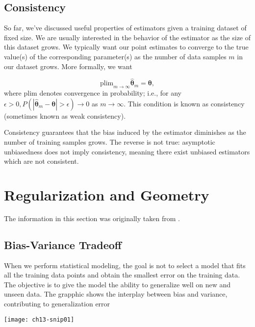 \subsection{Consistency}

So far, we've discussed useful properties of estimators given a training dataset of fixed size. We are usually interested in the behavior of the estimator as the size of this dataset grows. We typically want our point estimates to converge to the true value(s) of the corresponding parameter(s) as the number of data samples $m$ in our dataset grows. More formally, we want

\begin{equation}
\text{plim}_{m \rightarrow \infty} \boldsymbol{\hat\theta}_m = \boldsymbol{\theta},
\end{equation}
where $\text{plim}$ denotes convergence in probability; i.e., for any $\epsilon > 0, P(|\boldsymbol{\hat\theta}_m - \boldsymbol{\theta}| > \epsilon) \rightarrow 0$ as $m \rightarrow \infty$. This condition is known as consistency (sometimes known as weak consistency).

Consistency guarantees that the bias induced by the estimator diminishes as the number of training samples grows. The reverse is not true: asymptotic unbiasedness does not imply consistency, meaning there exist unbiased estimators which are not consistent.


\clearpage
\section{Regularization and Geometry}

The information in this section was originally taken from \cite{MinhPham2019,AnujaNagpal2017}.

\subsection{Bias-Variance Tradeoff}

When we perform statistical modeling, the goal is not to select a model that fits all the training data points and obtain the smallest error on the training data. The objective is to give the model the ability to generalize well on new and unseen data.
The grapphic shows the interplay between bias and variance, contributing to generalization error \cite{DanielSaunders2017}
\begin{marginfigure}
\texttt{[image: ch13-snip01]}
\end{marginfigure}

